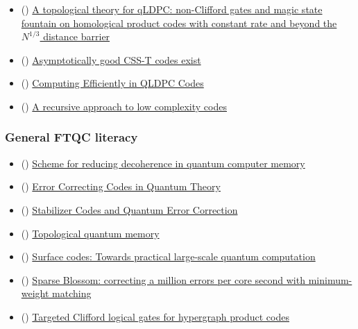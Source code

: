 \documentclass{article}
\begin{document}
\begin{itemize}
    \item () \cite{zhu2025topologicaltheoryqldpcnonclifford} \href{https://arxiv.org/abs/2501.19375}{A topological theory for qLDPC: non-Clifford gates and magic state fountain on homological product codes with constant rate and beyond the $N^{1/3}$ distance barrier}
    \item () \cite{berardini2024asymptoticallygoodcsstcodes} \href{https://www.arxiv.org/abs/2412.08586}{Asymptotically good CSS-T codes exist}
    \item () \cite{malcolm2025computingefficientlyqldpccodes} \href{https://arxiv.org/abs/2502.07150}{Computing Efficiently in QLDPC Codes}
    \item () \cite{tanner1981recursiveapproachlowcomplexitycodes} \href{https://ieeexplore.ieee.org/stamp/stamp.jsp?arnumber=1056404&tag=1}{A recursive approach to low complexity codes}
    
\end{itemize}


\subsubsection{General FTQC literacy}
\begin{itemize}
    \item () \cite{Shor95} \href{https://www.cs.miami.edu/home/burt/learning/Csc670.052/pR2493_1.pdf}{Scheme for reducing decoherence in quantum computer memory}
    \item () \cite{Steane1996ErrorCC} \href{https://users.physics.ox.ac.uk/~Steane/pubs/Steane_PRL95.pdf}{Error Correcting Codes in Quantum Theory}
    \item () \cite{gottesman1997stabilizercodesquantumerror} \href{https://arxiv.org/pdf/quant-ph/9705052}{Stabilizer Codes and Quantum Error Correction}
    \item () \cite{Dennis_2002} \href{https://arxiv.org/pdf/quant-ph/0110143}{Topological quantum memory} 
    \item () \cite{Fowler_2012} \href{https://arxiv.org/pdf/1208.0928}{Surface codes: Towards practical large-scale quantum computation}
    \item () \cite{higgott2023sparseblossomcorrectingmillion} \href{https://arxiv.org/pdf/2303.15933}{Sparse Blossom: correcting a million errors per core second with minimum-weight matching}
    \item () \cite{patra2024targetedcliffordlogicalgates} \href{https://arxiv.org/pdf/2411.17050}{Targeted Clifford logical gates for hypergraph product codes}
\end{itemize}
\end{document}
